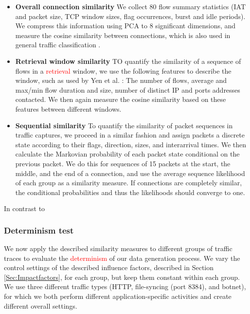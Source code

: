 \documentclass[sigconf]{acmart}
\begin{document}
\begin{itemize}
\item \textbf{Overall connection similarity} We collect 80 flow summary statistics (IAT and packet size, TCP window sizes, flag occurrences, burst and idle periods). We compress this information using PCA to 8 significant dimensions, and measure the cosine similarity between connections, which is also used in general traffic classification \cite{aun2017review}.
\item \textbf{Retrieval window similarity} 
TO quantify the similarity of a sequence of flows in a \textcolor{red}{retrieval} window, we use the following features to describe the window, such as used by Yen et al. \cite{yen2009browser}: The number of flows, average and max/min flow duration and size, number of distinct IP and ports addresses contacted. We then again measure the cosine similarity based on these features between different windows. 

\item \textbf{Sequential similarity} To quantify the similarity of packet sequences in traffic captures, we proceed in a similar fashion and assign packets a discrete state according to their flags, direction, sizes, and interarrival times. We then calculate the Markovian probability of each packet state conditional on the previous packet. We do this for sequences of 15 packets at the start, the middle, and the end of a connection, and use the average sequence likelihood of each group as a similarity measure. If connections are completely similar, the conditional probabilities and thus the likelihoods should converge to one.
\end{itemize}

In contrast to 


\subsubsection{Determinism test}


We now apply the described similarity measures to different groups of traffic traces to evaluate the \textcolor{red}{determinism} of our data generation process. We vary the control settings of the described influence factors, described in Section \ref{Sec:Impactfactors}, for each group, but keep them constant within each group. We use three different traffic types (HTTP, file-syncing (port 8384), and botnet), for which we both perform different application-specific activities and create different overall settings. 
\end{document}
